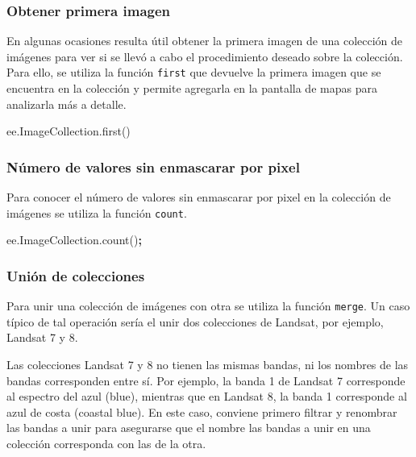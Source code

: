 \documentclass[
]{article}
\newenvironment{Shaded}{\begin{snugshade}}{\end{snugshade}}
\newcommand{\AttributeTok}[1]{\textcolor[rgb]{0.77,0.63,0.00}{#1}}
\newcommand{\NormalTok}[1]{#1}
\newcommand{\OperatorTok}[1]{\textcolor[rgb]{0.81,0.36,0.00}{\textbf{#1}}}
\newcommand{\VariableTok}[1]{\textcolor[rgb]{0.00,0.00,0.00}{#1}}
\begin{document}
\hypertarget{obtener-primera-imagen}{%
\subsubsection{Obtener primera imagen}\label{obtener-primera-imagen}}

En algunas ocasiones resulta útil obtener la primera imagen de una
colección de imágenes para ver si se llevó a cabo el procedimiento
deseado sobre la colección. Para ello, se utiliza la función
\texttt{first} que devuelve la primera imagen que se encuentra en la
colección y permite agregarla en la pantalla de mapas para analizarla
más a detalle.

\begin{Shaded}
\begin{Highlighting}[]
\VariableTok{ee}\NormalTok{.}\VariableTok{ImageCollection}\NormalTok{.}\AttributeTok{first}\NormalTok{()}
\end{Highlighting}
\end{Shaded}

\hypertarget{nuxfamero-de-valores-sin-enmascarar-por-pixel}{%
\subsubsection{Número de valores sin enmascarar por
pixel}\label{nuxfamero-de-valores-sin-enmascarar-por-pixel}}

Para conocer el número de valores sin enmascarar por pixel en la
colección de imágenes se utiliza la función \texttt{count}.

\begin{Shaded}
\begin{Highlighting}[]
\VariableTok{ee}\NormalTok{.}\VariableTok{ImageCollection}\NormalTok{.}\AttributeTok{count}\NormalTok{()}\OperatorTok{;}
\end{Highlighting}
\end{Shaded}

\hypertarget{uniuxf3n-de-colecciones}{%
\subsubsection{Unión de colecciones}\label{uniuxf3n-de-colecciones}}

Para unir una colección de imágenes con otra se utiliza la función
\texttt{merge}. Un caso típico de tal operación sería el unir dos
colecciones de Landsat, por ejemplo, Landsat 7 y 8.

\begin{tipblock}
Las colecciones Landsat 7 y 8 no tienen las mismas bandas, ni los
nombres de las bandas corresponden entre sí. Por ejemplo, la banda 1 de
Landsat 7 corresponde al espectro del azul (blue), mientras que en
Landsat 8, la banda 1 corresponde al azul de costa (coastal blue). En
este caso, conviene primero filtrar y renombrar las bandas a unir para
asegurarse que el nombre las bandas a unir en una colección corresponda
con las de la otra.

\end{tipblock}
\end{document}
